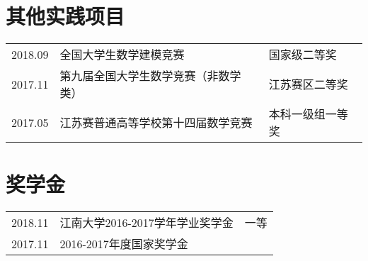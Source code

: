 \documentclass[]{deedy-resume-openfont}
\begin{document}
\begin{minipage}[t]{0.77\textwidth}

	\section{其他实践项目}
    \begin{tabular}{lll}
        2018.09 & 全国大学生数学建模竞赛 & 国家级二等奖 \\
        2017.11 & 第九届全国大学生数学竞赛（非数学类） & 江苏赛区二等奖 \\
        2017.05 & 江苏赛普通高等学校第十四届数学竞赛 & 本科一级组一等奖\\
	\end{tabular}
    \sectionsep

	\section{奖学金}
    \begin{tabular}{lll}
        2018.11 & 江南大学2016-2017学年学业奖学金 & 一等 \\
        2017.11 & 2016-2017年度国家奖学金 & \\
	\end{tabular}
    \sectionsep
\end{minipage}
\end{document}
